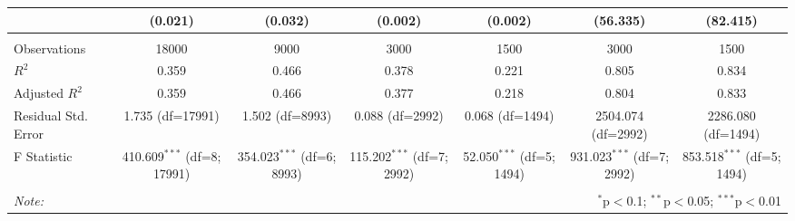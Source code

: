 \begin{table}[!htbp]
\begin{tabular}{@{\extracolsep{5pt}}lcccccc}
& (0.021) & (0.032) & (0.002) & (0.002) & (56.335) & (82.415) \\
\hline \\[-1.8ex]
 Observations & 18000 & 9000 & 3000 & 1500 & 3000 & 1500 \\
 $R^2$ & 0.359 & 0.466 & 0.378 & 0.221 & 0.805 & 0.834 \\
 Adjusted $R^2$ & 0.359 & 0.466 & 0.377 & 0.218 & 0.804 & 0.833 \\
 Residual Std. Error & 1.735 (df=17991) & 1.502 (df=8993) & 0.088 (df=2992) & 0.068 (df=1494) & 2504.074 (df=2992) & 2286.080 (df=1494) \\
 F Statistic & 410.609$^{***}$ (df=8; 17991) & 354.023$^{***}$ (df=6; 8993) & 115.202$^{***}$ (df=7; 2992) & 52.050$^{***}$ (df=5; 1494) & 931.023$^{***}$ (df=7; 2992) & 853.518$^{***}$ (df=5; 1494) \\
\hline
\hline \\[-1.8ex]
\textit{Note:} & \multicolumn{6}{r}{$^{*}$p$<$0.1; $^{**}$p$<$0.05; $^{***}$p$<$0.01} \\
\end{tabular}
\end{table}